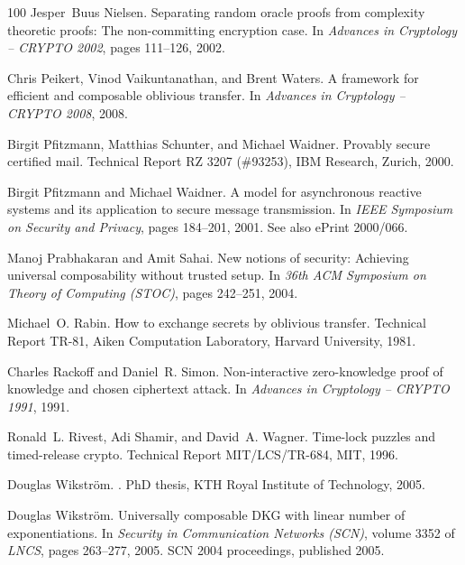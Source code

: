 \documentclass[11pt,a4paper]{article}
\begin{document}
\begin{thebibliography}{100}
Jesper~Buus Nielsen.
\newblock Separating random oracle proofs from complexity theoretic proofs: The
  non-committing encryption case.
\newblock In {\em Advances in Cryptology -- CRYPTO 2002}, pages 111--126, 2002.

Chris Peikert, Vinod Vaikuntanathan, and Brent Waters.
\newblock A framework for efficient and composable oblivious transfer.
\newblock In {\em Advances in Cryptology -- CRYPTO 2008}, 2008.

Birgit Pfitzmann, Matthias Schunter, and Michael Waidner.
\newblock Provably secure certified mail.
\newblock Technical Report RZ 3207 (\#93253), IBM Research, Zurich, 2000.

Birgit Pfitzmann and Michael Waidner.
\newblock A model for asynchronous reactive systems and its application to
  secure message transmission.
\newblock In {\em IEEE Symposium on Security and Privacy}, pages 184--201,
  2001.
\newblock See also ePrint 2000/066.

Manoj Prabhakaran and Amit Sahai.
\newblock New notions of security: Achieving universal composability without
  trusted setup.
\newblock In {\em 36th ACM Symposium on Theory of Computing (STOC)}, pages
  242--251, 2004.

Michael~O. Rabin.
\newblock How to exchange secrets by oblivious transfer.
\newblock Technical Report TR-81, Aiken Computation Laboratory, Harvard
  University, 1981.

Charles Rackoff and Daniel~R. Simon.
\newblock Non-interactive zero-knowledge proof of knowledge and chosen
  ciphertext attack.
\newblock In {\em Advances in Cryptology -- CRYPTO 1991}, 1991.

Ronald~L. Rivest, Adi Shamir, and David~A. Wagner.
\newblock Time-lock puzzles and timed-release crypto.
\newblock Technical Report MIT/LCS/TR-684, MIT, 1996.

Douglas Wikstr{\"o}m.
.
\newblock PhD thesis, KTH Royal Institute of Technology, 2005.

Douglas Wikstr{\"o}m.
\newblock Universally composable {DKG} with linear number of exponentiations.
\newblock In {\em Security in Communication Networks (SCN)}, volume 3352 of
  {\em LNCS}, pages 263--277, 2005.
\newblock SCN 2004 proceedings, published 2005.


\end{thebibliography}
\end{document}
